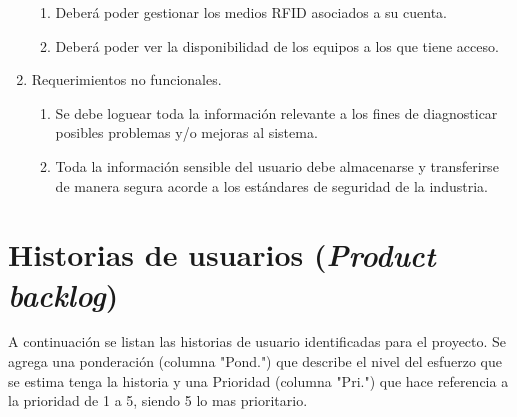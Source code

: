 \documentclass[11pt]{charter}
\begin{document}
\begin{enumerate}
\begin{enumerate}
\item Deberá poder gestionar los medios RFID asociados a su cuenta. 
\item Deberá poder ver la disponibilidad de los equipos a los que tiene acceso. 
	\end{enumerate}
\item Requerimientos no funcionales.
\begin{enumerate}
\item Se debe loguear toda la información relevante a los fines de diagnosticar posibles problemas y/o mejoras al sistema.
\item Toda la información sensible del usuario debe almacenarse y transferirse de manera segura acorde a los estándares de seguridad de la industria. 
	\end{enumerate}
\end{enumerate}

\section{Historias de usuarios (\textit{Product backlog})}
\label{sec:backlog}


A continuación se listan las historias de usuario identificadas para el proyecto. Se agrega una ponderación (columna "Pond.") que describe el nivel del esfuerzo que se estima tenga la historia y una Prioridad (columna "Pri.") que hace referencia a la prioridad de 1 a 5, siendo 5 lo mas prioritario.
\end{document}

